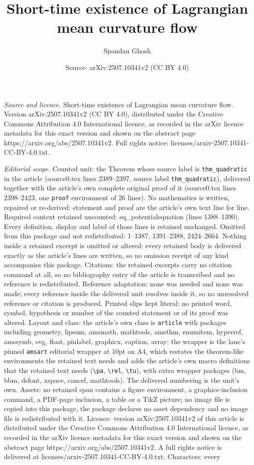 \documentclass[10pt,a4paper]{amsart}
\title[Short-time existence of Lagrangian mean curvature flow]{Short-time existence of Lagrangian mean curvature flow}
\author{Spandan Ghosh}
\date{Source: arXiv:2507.10341v2 (CC BY 4.0)}
\begin{document}
\maketitle

\noindent\emph{Source and licence.} Short-time existence of Lagrangian mean curvature flow. Version arXiv:2507.10341v2 (CC BY 4.0), distributed under the Creative Commons Attribution 4.0 International licence, as recorded in the arXiv licence metadata for this exact version and shown on the abstract page https://arxiv.org/abs/2507.10341v2. Full rights notice: licenses/arxiv-2507.10341-CC-BY-4.0.txt.\par\smallskip

\noindent\textit{Editorial scope.} Counted unit: the Theorem whose source label is \texttt{thm\_quadratic} in the article (source0.tex lines 2389--2397, source label \texttt{thm\_quadratic}), delivered together with the article's own complete original proof of it (source0.tex lines 2398--2423, one \texttt{proof} environment of 26 lines). No mathematics is written, repaired or re-derived: statement and proof are the article's own text line for line. Required context retained uncounted: eq\_potentialequation (lines 1388--1390). Every definition, display and label of those lines is retained unchanged. Omitted from this package and not redistributed: 1--1387, 1391--2388, 2424--2664. Nothing inside a retained excerpt is omitted or altered: every retained body is delivered exactly as the article's lines are written, so no omission receipt of any kind accompanies this package. Citations: the retained excerpts carry no citation command at all, so no bibliography entry of the article is transcribed and no reference is redistributed. Reference adaptation: none was needed and none was made; every reference inside the delivered unit resolves inside it, so no unresolved reference or citation is produced. Printed slips kept literal: no printed word, symbol, hypothesis or number of the counted statement or of its proof was altered. Layout and class: the article's own class is \texttt{article} with packages including geometry, lipsum, amsmath, mathtools, amsthm, enumitem, hyperref, amssymb, svg, float, pinlabel, graphicx, caption, array; the wrapper is the lane's pinned \texttt{amsart} editorial wrapper at 10pt on A4, which restates the theorem-like environments the retained text needs and adds the article's own macro definitions that the retained text needs (\texttt{\textbackslash pa}, \texttt{\textbackslash rel}, \texttt{\textbackslash tu}), with extra wrapper packages (bm, bbm, dsfont, xspace, cancel, mathtools). The delivered numbering is the unit's own. Assets: no retained span contains a figure environment, a graphics-inclusion command, a PDF-page inclusion, a table or a TikZ picture; no image file is copied into this package, the package declares no asset dependency and no image file is redistributed with it. Licence: version arXiv:2507.10341v2 of this article is distributed under the Creative Commons Attribution 4.0 International licence, as recorded in the arXiv licence metadata for this exact version and shown on the abstract page https://arxiv.org/abs/2507.10341v2. A full rights notice is delivered at licenses/arxiv-2507.10341-CC-BY-4.0.txt. Characters: every 
\end{document}
